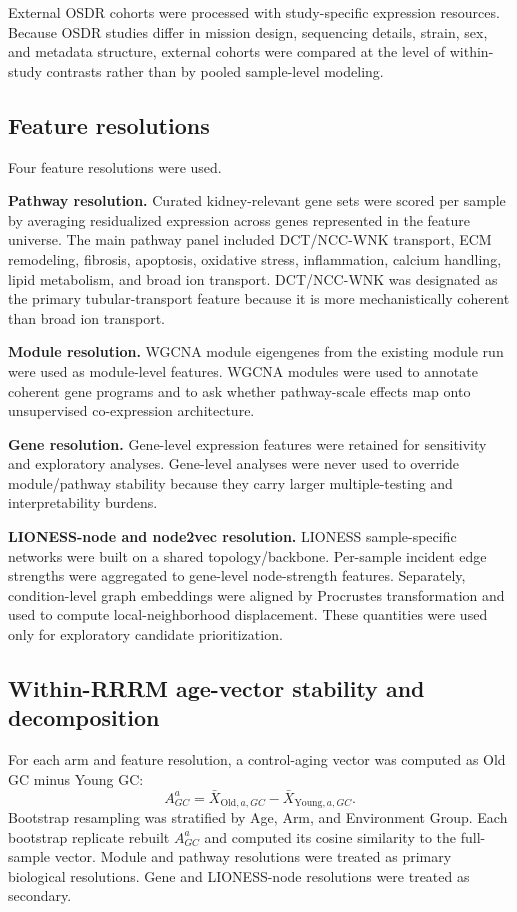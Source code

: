 \documentclass[11pt]{article}
\begin{document}
External OSDR cohorts were processed with study-specific expression resources. Because OSDR studies differ in mission design, sequencing details, strain, sex, and metadata structure, external cohorts were compared at the level of within-study contrasts rather than by pooled sample-level modeling.

\subsection{Feature resolutions}

Four feature resolutions were used.

\textbf{Pathway resolution.} Curated kidney-relevant gene sets were scored per sample by averaging residualized expression across genes represented in the feature universe. The main pathway panel included DCT/NCC-WNK transport, ECM remodeling, fibrosis, apoptosis, oxidative stress, inflammation, calcium handling, lipid metabolism, and broad ion transport. DCT/NCC-WNK was designated as the primary tubular-transport feature because it is more mechanistically coherent than broad ion transport.

\textbf{Module resolution.} WGCNA module eigengenes from the existing module run were used as module-level features. WGCNA modules were used to annotate coherent gene programs and to ask whether pathway-scale effects map onto unsupervised co-expression architecture.

\textbf{Gene resolution.} Gene-level expression features were retained for sensitivity and exploratory analyses. Gene-level analyses were never used to override module/pathway stability because they carry larger multiple-testing and interpretability burdens.

\textbf{LIONESS-node and node2vec resolution.} LIONESS sample-specific networks were built on a shared topology/backbone. Per-sample incident edge strengths were aggregated to gene-level node-strength features. Separately, condition-level graph embeddings were aligned by Procrustes transformation and used to compute local-neighborhood displacement. These quantities were used only for exploratory candidate prioritization.

\subsection{Within-RRRM age-vector stability and decomposition}

For each arm and feature resolution, a control-aging vector was computed as Old GC minus Young GC:
\begin{equation}
A^a_{GC}=\bar{X}_{\mathrm{Old},a,GC}-\bar{X}_{\mathrm{Young},a,GC}.
\end{equation}
Bootstrap resampling was stratified by Age, Arm, and Environment Group. Each bootstrap replicate rebuilt $A^a_{GC}$ and computed its cosine similarity to the full-sample vector. Module and pathway resolutions were treated as primary biological resolutions. Gene and LIONESS-node resolutions were treated as secondary.
\end{document}
